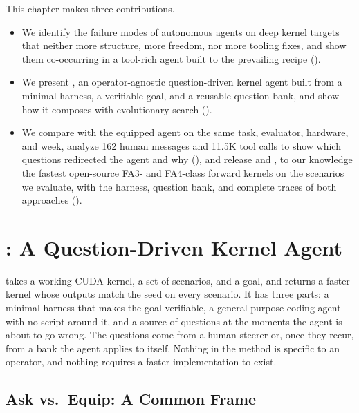 \noindent This chapter makes three contributions.
\begin{itemize}[nosep,leftmargin=*]
\item We identify the failure modes of autonomous agents on deep kernel targets that neither more
structure, more freedom, nor more tooling fixes, and show them co-occurring in a tool-rich agent
built to the prevailing recipe ().
\item We present \KernelSeek, an operator-agnostic question-driven kernel agent built from a minimal
harness, a verifiable goal, and a reusable question bank, and show how it composes with
evolutionary search ().
\item We compare \KernelSeek with the equipped agent on the same task, evaluator, hardware, and week,
analyze 162 human messages and 11.5K tool calls to show which questions redirected the agent and
why (), and release \ksFaThree and \ksFaFour, to our knowledge the fastest open-source
FA3- and FA4-class forward kernels on the scenarios we evaluate, with the harness, question bank,
and complete traces of both approaches ().
\end{itemize}

\section{\KernelSeek: A Question-Driven Kernel Agent}
\label{kernelseek:sec:workflow}

\KernelSeek takes a working CUDA kernel, a set of scenarios, and a goal, and returns a faster kernel whose
outputs match the seed on every scenario. It has three parts: a minimal harness that makes the goal
verifiable, a general-purpose coding agent with no script around it, and a source of questions at the
moments the agent is about to go wrong. The questions come from a human steerer or, once they recur,
from a bank the agent applies to itself. Nothing in the method is specific to an operator, and
nothing requires a faster implementation to exist.

\subsection{Ask vs.\ Equip: A Common Frame}
\label{kernelseek:sec:ask-vs-equip}
\label{kernelseek:sec:frame}


